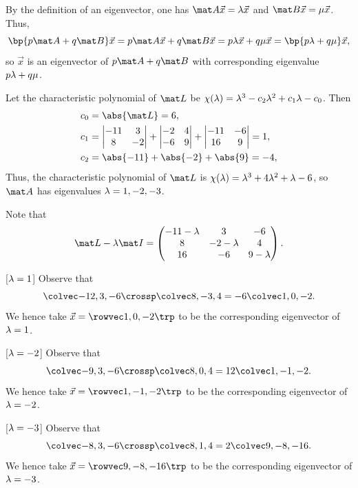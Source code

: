 \begin{solution}
    By the definition of an eigenvector, one has $\mat A \vec x = \l \vec x$ and $\mat B \vec x = \m \vec x$. Thus, \[\bp{p\mat A + q\mat B}\vec x = p \mat A \vec x + q\mat B \vec x = p \l \vec x + q \m \vec x = \bp{p \l + q \m} \vec x,\] so $\vec x$ is an eigenvector of $p\mat A + q\mat B$ with corresponding eigenvalue $p\lambda + q\mu$.

    Let the characteristic polynomial of $\mat L$ be $\chi(\lambda) = \lambda^3 - c_2 \lambda^2 + c_1 \lambda - c_0$. Then
    \begin{align*}
        c_0 &= \abs{\mat L} = 6,\\
        c_1 &= \begin{vmatrix}-11 & 3 \\ 8 & -2\end{vmatrix} + \begin{vmatrix}-2 & 4 \\ -6 & 9\end{vmatrix} + \begin{vmatrix}-11 & -6 \\ 16 & 9\end{vmatrix} = 1,\\
        c_2 &= \abs{-11} + \abs{-2} + \abs{9} = -4,
    \end{align*}
    Thus, the characteristic polynomial of $\mat L$ is $\chi(\lambda) = \lambda^3 + 4\lambda^2 + \lambda - 6$, so $\mat A$ has eigenvalues $\lambda = 1, -2, -3$.

    Note that \[\mat L - \l \mat I = \begin{pmatrix}-11-\l & 3 & -6 \\ 8 & -2-\l & 4 \\ 16 & -6 & 9-\l\end{pmatrix}.\]

    [$\lambda = 1$] Observe that \[\cveciii{-12}3{-6} \crossp \cveciii8{-3}{4} = -6 \cveciii10{-2}.\] We hence take $\vec x = \cveciiix10{-2}$ to be the corresponding eigenvector of $\lambda = 1$.

    [$\lambda = -2$] Observe that \[\cveciii{-9}3{-6} \crossp \cveciii8{0}{4} = 12 \cveciii1{-1}{-2}.\] We hence take $\vec x = \cveciiix1{-1}{-2}$ to be the corresponding eigenvector of $\lambda = -2$.

    [$\lambda = -3$] Observe that \[\cveciii{-8}3{-6} \crossp \cveciii8{1}{4} = 2 \cveciii9{-8}{-16}.\] We hence take $\vec x = \cveciiix9{-8}{-16}$ to be the corresponding eigenvector of $\lambda = -3$.


\end{solution}
